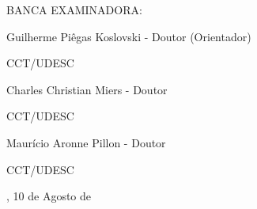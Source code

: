 

%
% 
%
\begin{folhadeaprovacao}



	\begin{center}
		{\selectfont\MakeTextUppercase{\normalsize\imprimirautor}}
	\end{center}
    \vfill
    
	\vfill
	\begin{center}
		{\selectfont\MakeTextUppercase{\imprimirtitulo}}
	\end{center}
	\vfill

    
%


\vfill
        
	 \begin{center}
	 	
    	{\selectfont BANCA EXAMINADORA: }
    	\vspace*{1.75cm}
    
        \assinatura{\textbf{} }
		Guilherme Piêgas Koslovski - Doutor (Orientador)\par
		CCT/UDESC
	 \end{center}
	
    
	\begin{center}
		\vspace*{1.25cm}
		\assinatura{\textbf{} }
		Charles Christian Miers - Doutor \par
		CCT/UDESC
		
		\vspace*{1.25cm}
		\assinatura{\textbf{} }
		Maurício Aronne Pillon - Doutor \par
		CCT/UDESC
		
		
	\end{center}
    
    \vspace*{\fill}  
    \begin{center}
    {\imprimirlocal, 10 de Agosto de \imprimirdata}
	\end{center}
    \vspace*{0.25cm}  
\end{folhadeaprovacao}





